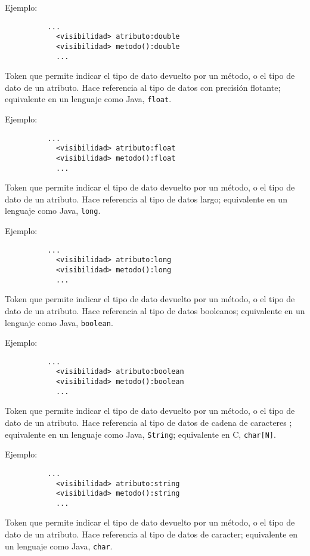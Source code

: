 \begin{description}[align=right,labelwidth=2.5cm]
	Ejemplo:
		\begin{lstlisting}
		  ...
			<visibilidad> atributo:double
			<visibilidad> metodo():double
			...
		\end{lstlisting}

\item [float] Token que permite indicar el tipo de dato devuelto por un método, o
	el tipo de dato de un atributo. Hace referencia al tipo de
	datos con precisión flotante; equivalente en un lenguaje como Java,
	\texttt{float}.

	Ejemplo:
		\begin{lstlisting}
		  ...
			<visibilidad> atributo:float
			<visibilidad> metodo():float
			...
		\end{lstlisting}

\item [long] Token que permite indicar el tipo de dato devuelto por un método, o
	el tipo de dato de un atributo. Hace referencia al tipo de
	datos largo; equivalente en un lenguaje como Java, \texttt{long}.

	Ejemplo:
		\begin{lstlisting}
		  ...
			<visibilidad> atributo:long
			<visibilidad> metodo():long
			...
		\end{lstlisting}

\item [boolean] Token que permite indicar el tipo de dato devuelto por un
	método, o
	el tipo de dato de un atributo. Hace referencia al tipo de
	datos booleanos; equivalente en un lenguaje como Java, \texttt{boolean}.

	Ejemplo:
		\begin{lstlisting}
		  ...
			<visibilidad> atributo:boolean
			<visibilidad> metodo():boolean
			...
		\end{lstlisting}

\item [string] Token que permite indicar el tipo de dato devuelto por un método, o
	el tipo de dato de un atributo. Hace referencia al tipo de
	datos de cadena de caracteres ; equivalente en un lenguaje como Java, \texttt{String};
	equivalente en C, \texttt{char[N]}.

	Ejemplo:
		\begin{lstlisting}
		  ...
			<visibilidad> atributo:string
			<visibilidad> metodo():string
			...
		\end{lstlisting}

\item [char] Token que permite indicar el tipo de dato devuelto por un método, o
	el tipo de dato de un atributo. Hace referencia al tipo de
	datos de caracter; equivalente en un lenguaje como Java, \texttt{char}.


\end{description}
